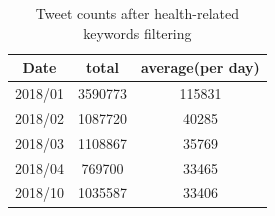 \begin{table}[!htbp]
    \centering
    \hspace{0.5cm}
    \begin{tabular}{ccc}
        Date & total & average(per day) \\ \hline
        2018/01 & 3590773 & 115831 \\
        2018/02 & 1087720 & 40285 \\
        2018/03 & 1108867 & 35769 \\
        2018/04 & 769700 & 33465 \\
        2018/10 & 1035587 & 33406 \\
    \end{tabular}
    \caption{Tweet counts after health-related keywords filtering}
    \label{tab:filtering2}
\end{table}

